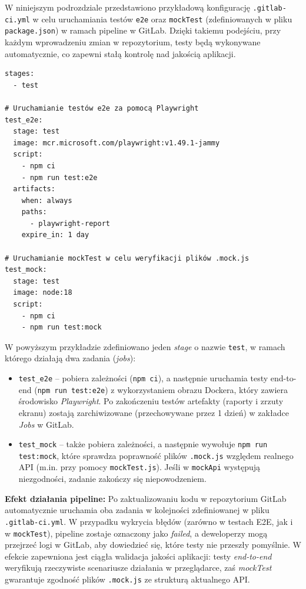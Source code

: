 \documentclass[12pt]{report}
\begin{document}
W niniejszym podrozdziale przedstawiono przykładową konfigurację \texttt{.gitlab-ci.yml} w celu uruchamiania testów \texttt{e2e} oraz \texttt{mockTest} (zdefiniowanych w pliku \texttt{package.json}) w ramach pipeline w GitLab. Dzięki takiemu podejściu, przy każdym wprowadzeniu zmian w repozytorium, testy będą wykonywane automatycznie, co zapewni stałą kontrolę nad jakością aplikacji.

\begin{verbatim}
stages:
  - test

# Uruchamianie testów e2e za pomocą Playwright
test_e2e:
  stage: test
  image: mcr.microsoft.com/playwright:v1.49.1-jammy
  script:
    - npm ci
    - npm run test:e2e
  artifacts:
    when: always
    paths:
      - playwright-report
    expire_in: 1 day

# Uruchamianie mockTest w celu weryfikacji plików .mock.js
test_mock:
  stage: test
  image: node:18
  script:
    - npm ci
    - npm run test:mock
\end{verbatim}

\noindent
W powyższym przykładzie zdefiniowano jeden \emph{stage} o nazwie \texttt{test}, w ramach którego działają dwa zadania (\emph{jobs}):
\begin{itemize}
  \item \texttt{test\_e2e} -- pobiera zależności (\texttt{npm ci}), a następnie uruchamia testy end-to-end (\texttt{npm run test:e2e}) z wykorzystaniem obrazu Dockera, który zawiera środowisko \emph{Playwright}. Po zakończeniu testów artefakty (raporty i zrzuty ekranu) zostają zarchiwizowane (przechowywane przez 1 dzień) w zakładce \emph{Jobs} w GitLab.
  \item \texttt{test\_mock} -- także pobiera zależności, a następnie wywołuje \texttt{npm run test:mock}, które sprawdza poprawność plików \texttt{.mock.js} względem realnego API (m.in. przy pomocy \texttt{mockTest.js}). Jeśli w \texttt{mockApi} występują niezgodności, zadanie zakończy się niepowodzeniem.
\end{itemize}

\noindent
\textbf{Efekt działania pipeline:}  
Po zaktualizowaniu kodu w repozytorium GitLab automatycznie uruchamia oba zadania w kolejności zdefiniowanej w pliku \texttt{.gitlab-ci.yml}. W przypadku wykrycia błędów (zarówno w testach E2E, jak i w \texttt{mockTest}), pipeline zostaje oznaczony jako \emph{failed}, a deweloperzy mogą przejrzeć logi w GitLab, aby dowiedzieć się, które testy nie przeszły pomyślnie. W efekcie zapewniona jest ciągła walidacja jakości aplikacji: testy \emph{end-to-end} weryfikują rzeczywiste scenariusze działania w przeglądarce, zaś \emph{mockTest} gwarantuje zgodność plików \texttt{.mock.js} ze strukturą aktualnego API.
\end{document}
